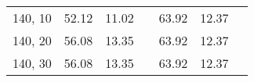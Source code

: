 \documentclass[12pt,a4paper]{article}
\begin{document}
\begin{table}[]
\begin{tabular}{ccccccc}
140, 10                                           & 52.12                                                    & 11.02    &                                                             & 63.92                                                   & 12.37    &                                                             \\
140, 20                                           & 56.08                                                    & 13.35    &                                                             & 63.92                                                   & 12.37    &                                                             \\
140, 30                                           & 56.08                                                    & 13.35    &                                                             & 63.92                                                   & 12.37    &                                                             \\ \hline
\end{tabular}
\end{table}
\end{document}
